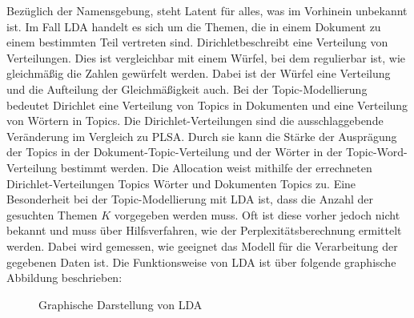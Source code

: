 \documentclass[german,version-2020-11]{uzl-thesis}
\begin{document}
Bezüglich der Namensgebung, steht \glqq Latent \grqq für alles, was im Vorhinein unbekannt ist. Im Fall LDA handelt es sich um die Themen, die in einem Dokument zu einem bestimmten Teil vertreten sind. \glqq Dirichlet\grqq beschreibt eine Verteilung von Verteilungen. Dies ist vergleichbar mit einem Würfel, bei dem regulierbar ist, wie gleichmäßig die Zahlen gewürfelt werden. Dabei ist der Würfel eine Verteilung und die Aufteilung der Gleichmäßigkeit auch. Bei der Topic-Modellierung bedeutet Dirichlet eine Verteilung von Topics in Dokumenten und eine Verteilung von Wörtern in Topics. Die Dirichlet-Verteilungen sind die ausschlaggebende Veränderung im Vergleich zu PLSA. Durch sie kann die Stärke der Ausprägung der Topics in der Dokument-Topic-Verteilung und der Wörter in der Topic-Word-Verteilung bestimmt werden. Die \glqq Allocation \grqq weist mithilfe der errechneten Dirichlet-Verteilungen Topics Wörter und Dokumenten Topics zu. Eine Besonderheit bei der Topic-Modellierung mit LDA ist, dass die Anzahl der gesuchten Themen $K$ vorgegeben werden muss. Oft ist diese vorher jedoch nicht bekannt und muss über Hilfsverfahren, wie der Perplexitätsberechnung ermittelt werden. Dabei wird gemessen, wie geeignet das Modell für die Verarbeitung der gegebenen Daten ist. Die Funktionsweise von LDA ist über folgende graphische Abbildung beschrieben: \\

\begin{figure}[H]
\centering
{}\caption{Graphische Darstellung von LDA}
\label{fig:ldagraphic}
\end{figure}
\end{document}
